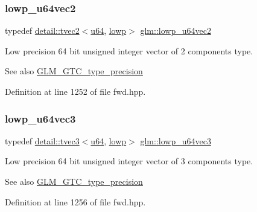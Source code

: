 \subsubsection{\texorpdfstring{lowp\+\_\+u64vec2}{lowp\_u64vec2}}
{\footnotesize\ttfamily typedef \hyperlink{structglm_1_1detail_1_1tvec2}{detail\+::tvec2}$<$\hyperlink{group__gtc__type__precision_ga71cedd4972f9cb1a5e14dfe5ab83ecd7}{u64}, \hyperlink{namespaceglm_a0f04f086094c747d227af4425893f545ae161af3fc695e696ce3bf69f7332bc2d}{lowp}$>$ \hyperlink{group__gtc__type__precision_gae0e7d3ed32e8e79b4f6dd0c9baafcaea}{glm\+::lowp\+\_\+u64vec2}}

Low precision 64 bit unsigned integer vector of 2 components type. \begin{DoxySeeAlso}{See also}
\hyperlink{group__gtc__type__precision}{G\+L\+M\+\_\+\+G\+T\+C\+\_\+type\+\_\+precision} 
\end{DoxySeeAlso}


Definition at line 1252 of file fwd.\+hpp.

\mbox{\label{group__gtc__type__precision_gaa62794e3f055a333a85c0e52376f2429}} 
\subsubsection{\texorpdfstring{lowp\+\_\+u64vec3}{lowp\_u64vec3}}
{\footnotesize\ttfamily typedef \hyperlink{structglm_1_1detail_1_1tvec3}{detail\+::tvec3}$<$\hyperlink{group__gtc__type__precision_ga71cedd4972f9cb1a5e14dfe5ab83ecd7}{u64}, \hyperlink{namespaceglm_a0f04f086094c747d227af4425893f545ae161af3fc695e696ce3bf69f7332bc2d}{lowp}$>$ \hyperlink{group__gtc__type__precision_gaa62794e3f055a333a85c0e52376f2429}{glm\+::lowp\+\_\+u64vec3}}

Low precision 64 bit unsigned integer vector of 3 components type. \begin{DoxySeeAlso}{See also}
\hyperlink{group__gtc__type__precision}{G\+L\+M\+\_\+\+G\+T\+C\+\_\+type\+\_\+precision} 
\end{DoxySeeAlso}


Definition at line 1256 of file fwd.\+hpp.

\mbox{\label{group__gtc__type__precision_ga1dc6d791a39dc52ee296a891d5b9b084}} 
